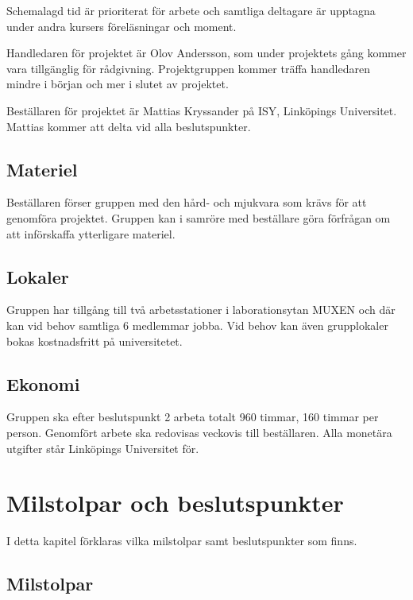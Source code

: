 \documentclass[a4paper,11pt]{article}
\begin{document}
Schemalagd tid är prioriterat för arbete och samtliga deltagare är upptagna under andra kursers föreläsningar och moment.

Handledaren för projektet är Olov Andersson, som under projektets gång kommer vara tillgänglig för rådgivning. Projektgruppen kommer träffa handledaren mindre i början och mer i slutet av projektet.

Beställaren för projektet är  Mattias Kryssander på ISY, Linköpings Universitet. Mattias kommer att delta vid alla beslutspunkter.

\subsection{Materiel}
Beställaren förser gruppen med den hård- och mjukvara som krävs för att genomföra projektet. Gruppen kan i samröre med beställare göra förfrågan om att införskaffa ytterligare materiel. 

\subsection{Lokaler}
Gruppen har tillgång till två arbetsstationer i laborationsytan MUXEN och där kan vid behov samtliga 6 medlemmar jobba. Vid behov kan även grupplokaler bokas kostnadsfritt på universitetet.

\subsection{Ekonomi}
Gruppen ska efter beslutspunkt 2 arbeta totalt 960 timmar, 160 timmar per person. Genomfört arbete ska redovisas veckovis till beställaren. Alla monetära utgifter står Linköpings Universitet för.

\section{Milstolpar och beslutspunkter}
I detta kapitel förklaras vilka milstolpar samt beslutspunkter som finns.

\subsection{Milstolpar}
\begin{flushleft}
    \begin{LIPSmilstolpar}
    \end{LIPSmilstolpar}
\end{flushleft}
\end{document}
